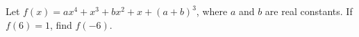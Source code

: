Let $f(x)=ax^4+x^3+bx^2+x+(a+b)^3$, where $a$ and $b$ are real constants. If $f(6)=1$, find $f(-6)$.
